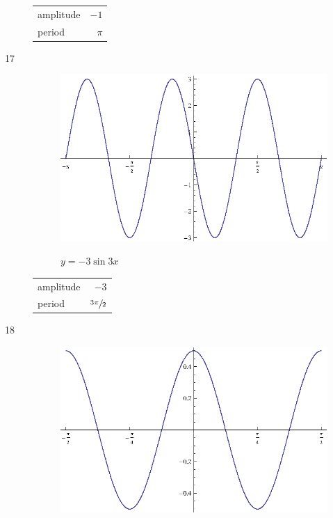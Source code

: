 \documentclass{exam}
\begin{document}
\begin{description}
        \begin{tabular}[H]{lr}
          \toprule
          amplitude & $-1$ \\
          period    & $\pi$ \\
          \bottomrule
        \end{tabular}

      \item[17]
        \begin{figure}[H]
          \centering
          \includegraphics[scale=0.9]{exercise17.eps}

          $y = - 3 \sin 3x$
        \end{figure}

        \begin{tabular}[H]{lr}
          \toprule
          amplitude & $-3$ \\
          period    & $\sfrac{3 \pi}{2}$ \\
          \bottomrule
        \end{tabular}

      \item[18]
        \begin{figure}[H]
          \centering
          \includegraphics[scale=0.9]{exercise18.eps}


\end{figure}
\end{description}
\end{document}
